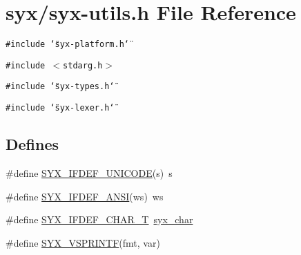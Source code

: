 \hypertarget{syx-utils_8h}{
\section{syx/syx-utils.h File Reference}
\label{syx-utils_8h}
}
{\tt \#include \char`\"{}syx-platform.h\char`\"{}}\par
{\tt \#include $<$stdarg.h$>$}\par
{\tt \#include \char`\"{}syx-types.h\char`\"{}}\par
{\tt \#include \char`\"{}syx-lexer.h\char`\"{}}\par
\subsection*{Defines}
\begin{CompactItemize}
\item 
\#define \hyperlink{syx-utils_8h_880e9ca9f6d068301042531820aa473a}{SYX\_\-IFDEF\_\-UNICODE}(s)~s
\item 
\#define \hyperlink{syx-utils_8h_f825cdcdcf8c4abef4ffd0877aa201c5}{SYX\_\-IFDEF\_\-ANSI}(ws)~ws
\item 
\#define \hyperlink{syx-utils_8h_47eb1a8eeabab0af8148bbf785800e6a}{SYX\_\-IFDEF\_\-CHAR\_\-T}~\hyperlink{syx-types_8h_22636fad803dd674d2640c323df20a11}{syx\_\-char}
\item 
\#define \hyperlink{syx-utils_8h_91e1a9f99651d305d28a9624c8461d68}{SYX\_\-VSPRINTF}(fmt, var)
\end{CompactItemize}
